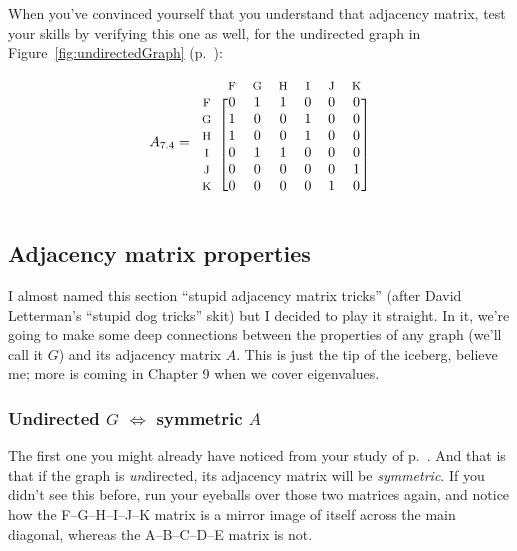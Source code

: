 \begin{alttitles}
When you've convinced yourself that you understand that adjacency matrix, test
your skills by verifying this one as well, for the undirected graph in 
Figure~\ref{fig:undirectedGraph} (p.~\pageref{fig:undirectedGraph}):

\[
A_{7.4} = 
\begin{blockarray}{ccccccc}
& {\footnotesize\textrm{F}} & {\footnotesize\textrm{G}} & {\footnotesize\textrm{H}} & {\footnotesize\textrm{I}} & {\footnotesize\textrm{J}} & {\footnotesize\textrm{K}} \\
\begin{block}{c[cccccc]}
{\footnotesize\textrm{F}} & 0 & 1 & 1 & 0 & 0 & 0 \\
{\footnotesize\textrm{G}} & 1 & 0 & 0 & 1 & 0 & 0 \\
{\footnotesize\textrm{H}} & 1 & 0 & 0 & 1 & 0 & 0 \\
{\footnotesize\textrm{I}} & 0 & 1 & 1 & 0 & 0 & 0 \\
{\footnotesize\textrm{J}} & 0 & 0 & 0 & 0 & 0 & 1 \\
{\footnotesize\textrm{K}} & 0 & 0 & 0 & 0 & 1 & 0 \\
\end{block}
\end{blockarray}
\]


\subsection{Adjacency matrix properties}


I almost named this section ``stupid adjacency matrix tricks'' (after David
Letterman's ``stupid dog tricks'' skit) but I decided to play it straight. In
it, we're going to make some deep connections between the properties of any
graph (we'll call it $G$) and its adjacency matrix $A$. This is just the tip of
the iceberg, believe me; more is coming in Chapter 9 when we cover eigenvalues.

\subsubsection{Undirected $G$ $\Leftrightarrow$ symmetric $A$}


The first one you might already have noticed from your study of
p.~\pageref{firstAdjacencyMatrix}. And that is that if the graph is
\textit{un}directed, its adjacency matrix will be \textit{symmetric}. If you
didn't see this before, run your eyeballs over those two matrices again, and
notice how the F--G--H--I--J--K matrix is a mirror image of itself across the
main diagonal, whereas the A--B--C--D--E matrix is not.


\end{alttitles}
